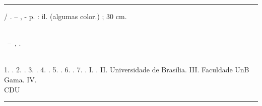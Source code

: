 \begin{fichacatalografica}
\vspace*{\fill} %
\hrule	%
\begin{center} %
\begin{minipage}[c]{12.5cm} %
\imprimirautor
\hspace{0.5cm} \imprimirtitulo / \imprimirautor. --
\imprimirlocal, \imprimirdata-
\hspace{0.5cm} \pageref{LastPage} p. : il. (algumas color.) ; 30 cm.\\
\hspace{0.5cm} \imprimirorientadorRotulo~\imprimirorientador\\
\hspace{0.5cm}
\parbox[t]{\textwidth}{\imprimirtipotrabalho~--~\imprimirinstituicao,
\imprimirdata.}\\
\hspace{0.5cm}
1. \imprimirpalavrachaveum.
2. \imprimirpalavrachavedois.
3. \imprimirpalavrachavetres.
4. \imprimirpalavrachavequatro.
5. \imprimirpalavrachavecinco.
6. \imprimirpalavrachaveseis.
7. \imprimirpalavrachavesete.
I. \imprimirorientador.
II. Universidade de Brasília.
III. Faculdade UnB Gama.
IV. \imprimirtitulo\\
\hspace{8.75cm} CDU \nomecdu\\
\end{minipage}
\end{center}
\hrule
\end{fichacatalografica}